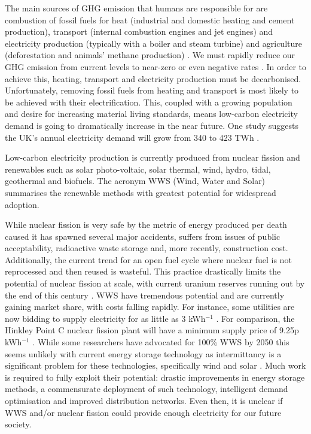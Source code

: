 The main sources of GHG emission that humans are responsible for are combustion of fossil fuels for heat (industrial and domestic heating and cement production), transport (internal combustion engines and jet engines) and electricity production (typically with a boiler and steam turbine) and agriculture (deforestation and animals' methane production) \cite{MacKay2009}. We must rapidly reduce our GHG emission from current levels to near-zero or even negative rates \cite{MacKay2009}. In order to achieve this, heating, transport and electricity production must be decarbonised. Unfortunately, removing fossil fuels from heating and transport is most likely to be achieved with their electrification. This, coupled with a growing population and desire for increasing material living standards, means low-carbon electricity demand is going to dramatically increase in the near future. One study suggests the UK's annual electricity demand will grow from 340 to 423 TWh \cite{Bossmann2015}. 


Low-carbon electricity production is currently produced from nuclear fission and renewables such as solar photo-voltaic, solar thermal, wind, hydro, tidal, geothermal and biofuels. The acronym WWS (Wind, Water and Solar)  summarises the renewable methods with greatest potential for widespread adoption. 

While nuclear fission is very safe by the metric of energy produced per death caused \cite{Markandya2007} it has spawned several major accidents, suffers from issues of public acceptability, radioactive waste storage and, more recently, construction cost. Additionally, the current trend for an open fuel cycle where nuclear fuel is not reprocessed and then reused is wasteful. This practice drastically limits the potential of nuclear fission at scale, with current uranium reserves running out by the end of this century \cite{OECD2013}. WWS have tremendous potential and are currently gaining market share, with costs falling rapidly. For instance, some utilities are now bidding to supply electricity for as little as 3\textcent \: kWh$^{-1}$ \cite{IRENA2018}. For comparison, the Hinkley Point C nuclear fission plant will have a minimum supply price of 9.25p kWh$^{-1}$ \cite{NAO2017}. While some researchers have advocated for 100\% WWS by 2050 \cite{Jacobson2018} this seems unlikely with current energy storage technology as intermittancy is a significant problem for these technologies, specifically wind and solar \cite{Clack2017}. Much work is required to fully exploit their potential: drastic improvements in energy storage methods, a commensurate deployment of such technology, intelligent demand optimisation and improved distribution networks. Even then, it is unclear if WWS and/or nuclear fission could provide enough electricity for our future society. 

